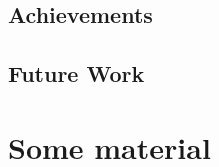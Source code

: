 \documentclass[mscthesis]{usiinfthesis}
\begin{document}
\section{Achievements}
\section{Future Work}

\nocite{*}

\appendix %

\chapter{Some material}

\backmatter


%
%
%
%
%

%


\end{document}
